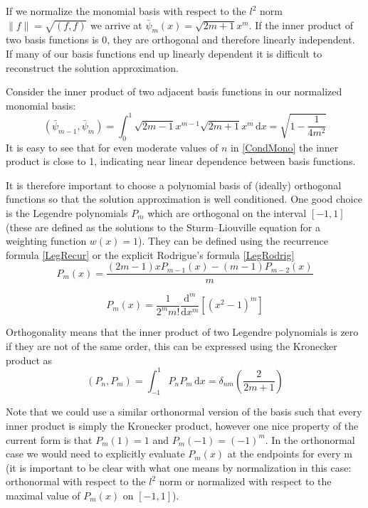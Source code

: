 \documentclass[letterpaper]{article}
\begin{document}
If we normalize the monomial basis with respect to the $l^2$ norm $\|f\|=\sqrt{(f,f)}$ we arrive at $\bar{\psi}_m(x) = \sqrt{2m+1}x^m$. If the inner product of two basis functions is 0, they are orthogonal and therefore linearly independent. If many of our basis functions end up linearly dependent it is difficult to reconstruct the solution approximation.

Consider the inner product of two adjacent basis functions in our normalized monomial basis:
	\begin{equation}\label{CondMono}
	(\bar{\psi}_{m-1},\bar{\psi}_m) = \int_0^1 \! \sqrt{2m-1}x^{m-1}\sqrt{2m+1}x^{m} \, \mathrm{d}x = \sqrt{1-\frac{1}{4m^2}}
	\end{equation}
It is easy to see that for even moderate values of $n$ in \eqref{CondMono} the inner product is close to 1, indicating near linear dependence between basis functions.

It is therefore important to choose a polynomial basis of (ideally) orthogonal functions so that the solution approximation is well conditioned. One good choice is the Legendre polynomials $P_m$ which are orthogonal on the interval $[-1,1]$ (these are defined as the solutions to the Sturm–Liouville equation for a weighting function $w(x)=1$). They can be defined using the recurrence formula \eqref{LegRecur} or the explicit Rodrigue's formula \eqref{LegRodrig}
	\begin{equation}\label{LegRecur}
	P_m(x) = \frac{(2m-1)xP_{m-1}(x) - (m-1)P_{m-2}(x)}{m}
	\end{equation}

	\begin{equation}\label{LegRodrig}
	P_m(x) = \frac{1}{2^m m!}\frac{\mathrm{d}^m}{\mathrm{d}x^m}\left[(x^2-1)^m\right]
	\end{equation}

Orthogonality means that the inner product of two Legendre polynomials is zero if they are not of the same order, this can be expressed using the Kronecker product as
	\begin{equation}\label{LegInnerProd}
	(P_n,P_m) = \int_{-1}^1 \! P_n P_m \, \mathrm{d}x = \delta_{nm} \left(\frac{2}{2m+1}\right)
	\end{equation}

Note that we could use a similar orthonormal version of the basis such that every inner product is simply the Kronecker product, however one nice property of the current form is that $P_m(1)=1$ and $P_m(-1)=(-1)^m$. In the orthonormal case we would need to explicitly evaluate $P_m(x)$ at the endpoints for every m (it is important to be clear with what one means by normalization in this case: orthonormal with respect to the $l^2$ norm or normalized with respect to the maximal value of $P_m(x)$ on $[-1,1]$).
\end{document}
